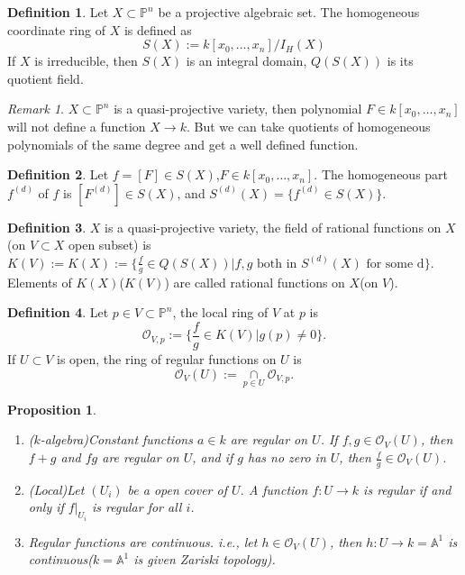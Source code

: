 \documentclass{amsart}
\theoremstyle{plain}
\newtheorem{proposition}{Proposition}
\theoremstyle{definition}
\newtheorem{definition}{Definition}
\theoremstyle{remark}
\newtheorem*{remark}{Remark}
\numberwithin{equation}{section}
\begin{document}
\begin{definition}
	Let $ X\subset\mathbb{P}^n $ be a projective algebraic set. The homogeneous coordinate ring of $ X $ is defined as
	\begin{equation}
	S(X):=k[x_0,\dots,x_n]/I_H(X)
	\end{equation}
	If $ X $ is irreducible, then $ S(X) $ is an integral domain, $ Q(S(X)) $ is its quotient field.
\end{definition}
\begin{remark}
	$ X\subset \mathbb{P}^n$ is a quasi-projective variety, then polynomial $ F\in k[x_0,\dots,x_n] $ will not define a function $ X\to k $. But we can take quotients of homogeneous polynomials of the same degree and get a well defined function.
\end{remark}
\begin{definition}
	Let $ f= [F]\in S(X) $,$ F\in k[x_0,\dots,x_n] $. The homogeneous part $ f^{(d)} $ of $ f $ is $ [F^{(d)}]\in S(X) $, and
	$ S^{(d)}(X) = \{ f^{(d)}\in S(X) \} $.
\end{definition}
\begin{definition}
	$ X $ is a quasi-projective variety, the field of rational functions on $ X $(on $ V \subset X$ open subset) is
	$ K(V):=K(X):=\{ \frac{f}{g}\in Q(S(X))|f,g \text{ both in } S^{(d)}(X) \text{ for some d} \} $.
	Elements of $ K(X) $($ K(V) $) are called rational functions on $ X $(on $ V $).
\end{definition}
\begin{definition}
	Let $ p\in V\subset\mathbb{P}^n $, the local ring of $ V $ at $ p $ is
	\begin{equation}
	\mathcal{O}_{V,p}:=\{ \frac{f}{g}\in K(V)|g(p)\neq 0 \}.
	\end{equation}
	If $ U\subset V $ is open, the ring of regular functions on $ U $ is
	\begin{equation}
	\mathcal{O}_V(U):=\mathop{\cap}\limits_{p\in U}\mathcal{O}_{V,p}.
	\end{equation}
\end{definition}
\begin{proposition}\label{8}
	\begin{enumerate}
		\item ($ k $-algebra)Constant functions $ a\in k $ are regular on $ U $. If $ f,g\in \mathcal{O}_V(U) $, then $ f+g $ and $ fg $ are regular on $ U $, and if $ g $ has no zero in $ U $, then $ \frac{f}{g} \in \mathcal{O}_{V}(U)$.
		\item (Local)Let $ (U_i) $ be a open cover of $ U $. A function $ f:U\to k $ is regular if and only if $ f|_{U_i} $ is regular for all $ i $.
		\item Regular functions are continuous. i.e., let $ h\in \mathcal{O}_V(U) $, then $ h:U\to k=\mathbb{A}^1 $ is continuous($ k=\mathbb{A}^1 $ is given Zariski topology).
	\end{enumerate}
\end{proposition}
\end{document}
